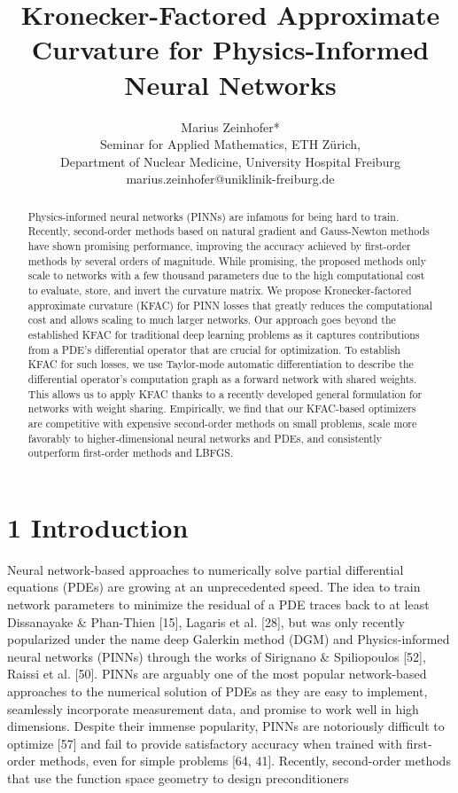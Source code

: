 \documentclass[10pt]{article}
\title{Kronecker-Factored Approximate Curvature for Physics-Informed Neural Networks }
\author{Marius Zeinhofer*\\
Seminar for Applied Mathematics, ETH Zürich,\\
Department of Nuclear Medicine, University Hospital Freiburg\\
marius.zeinhofer@uniklinik-freiburg.de}
\date{}
\begin{document}
\maketitle


\begin{abstract}
Physics-informed neural networks (PINNs) are infamous for being hard to train. Recently, second-order methods based on natural gradient and Gauss-Newton methods have shown promising performance, improving the accuracy achieved by first-order methods by several orders of magnitude. While promising, the proposed methods only scale to networks with a few thousand parameters due to the high computational cost to evaluate, store, and invert the curvature matrix. We propose Kronecker-factored approximate curvature (KFAC) for PINN losses that greatly reduces the computational cost and allows scaling to much larger networks. Our approach goes beyond the established KFAC for traditional deep learning problems as it captures contributions from a PDE's differential operator that are crucial for optimization. To establish KFAC for such losses, we use Taylor-mode automatic differentiation to describe the differential operator's computation graph as a forward network with shared weights. This allows us to apply KFAC thanks to a recently developed general formulation for networks with weight sharing. Empirically, we find that our KFAC-based optimizers are competitive with expensive second-order methods on small problems, scale more favorably to higher-dimensional neural networks and PDEs, and consistently outperform first-order methods and LBFGS.
\end{abstract}

\section*{1 Introduction}
Neural network-based approaches to numerically solve partial differential equations (PDEs) are growing at an unprecedented speed. The idea to train network parameters to minimize the residual of a PDE traces back to at least Dissanayake \& Phan-Thien [15], Lagaris et al. [28], but was only recently popularized under the name deep Galerkin method (DGM) and Physics-informed neural networks (PINNs) through the works of Sirignano \& Spiliopoulos [52], Raissi et al. [50]. PINNs are arguably one of the most popular network-based approaches to the numerical solution of PDEs as they are easy to implement, seamlessly incorporate measurement data, and promise to work well in high dimensions. Despite their immense popularity, PINNs are notoriously difficult to optimize [57] and fail to provide satisfactory accuracy when trained with first-order methods, even for simple problems [64, 41]. Recently, second-order methods that use the function space geometry to design preconditioners
\end{document}
